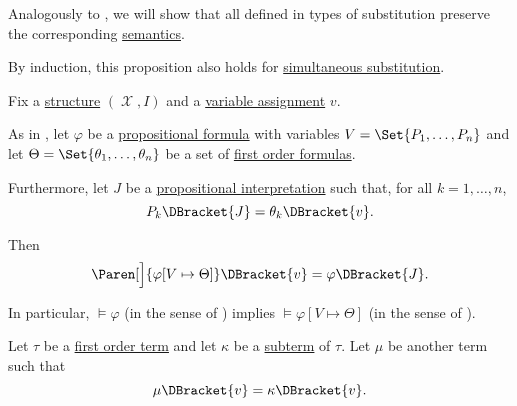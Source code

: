 \begin{proposition}\label{thm:first_order_substitution_equivalence}
  Analogously to , we will show that all defined in  types of substitution preserve the corresponding \hyperref[def:first_order_semantics]{semantics}.

  By induction, this proposition also holds for \hyperref[def:propositional_substitution/simultaneous]{simultaneous substitution}.

  Fix a \hyperref[def:first_order_structure]{structure} \( (\mscrX, I) \) and a \hyperref[def:first_order_valuation/variable_assignment]{variable assignment} \( v \).

  \begin{PropEnum}
     As in , let \( \varphi \) be a \hyperref[def:propositional_syntax/formula]{propositional formula} with variables \( {V = \Set{ P_1, \ldots, P_n }} \) and let \( \Theta = \Set{ \theta_1, \ldots, \theta_n } \) be a set of \hyperref[def:first_order_syntax/formula]{first order formulas}.

    Furthermore, let \( J \) be a \hyperref[def:propositional_valuation/interpretation]{propositional interpretation} such that, for all \( k = 1, \ldots, n \),
    \begin{equation}\label{eq:thm:first_order_substitution_equivalence/propositional/compatibility}
      P_k\DBracket{J} = \theta_k\DBracket{v}.
    \end{equation}

    Then
    \begin{equation}\label{eq:thm:first_order_substitution_equivalence/propositional}
      \Paren[\Big]{ \varphi[V \mapsto \Theta] }\DBracket{v} = \varphi \DBracket{J}.
    \end{equation}

    In particular, \( \vDash \varphi \) (in the sense of ) implies \( \vDash \varphi[V \mapsto \Theta] \) (in the sense of ).

     Let \( \tau \) be a \hyperref[def:first_order_syntax/term]{first order term} and let \( \kappa \) be a \hyperref[def:first_order_syntax/subterm]{subterm} of \( \tau \). Let \( \mu \) be another term such that
    \begin{equation}\label{eq:thm:first_order_substitution_equivalence/term_in_term/compatibility}
      \mu\DBracket{v} = \kappa\DBracket{v}.
    \end{equation}


\end{PropEnum}
\end{proposition}

